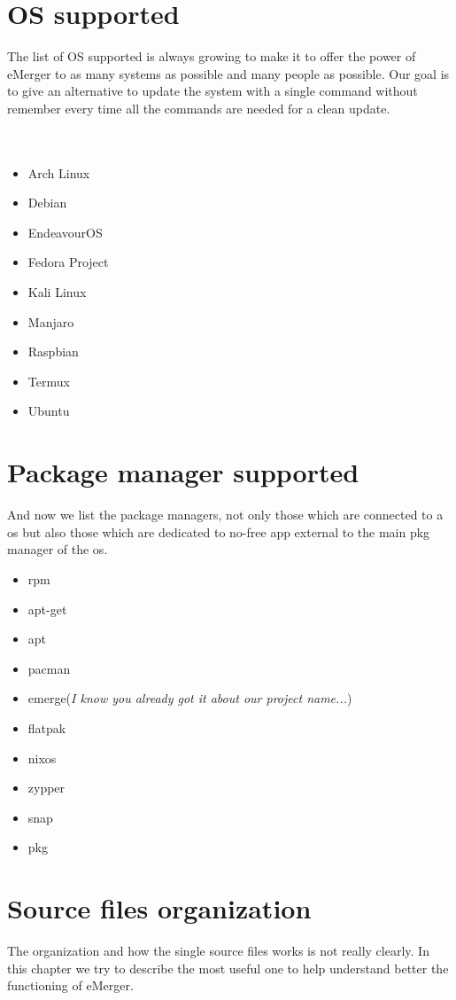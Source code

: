 \documentclass{article}
\begin{document}
\section{OS supported}
The list of OS supported is always growing to make it to offer the power of eMerger to as many systems as possible and many people as possible. Our goal is to give an alternative to update the system with a single command without remember every time all the commands are needed for a clean update. \\ \\ \\ 
\begin{itemize}
\item Arch Linux
\item Debian
\item EndeavourOS
\item Fedora Project
\item Kali Linux
\item Manjaro
\item Raspbian
\item Termux
\item Ubuntu
\end{itemize}
\section{Package manager supported}
And now we list the package managers, not only those which are connected to a os but also those which are dedicated to no-free app external to the main pkg manager of the os.
\begin{itemize}
\item rpm
\item apt-get
\item apt
\item pacman
\item emerge(\textit{I know you already got it about our project name...})
\item flatpak
\item nixos
\item zypper
\item snap
\item pkg
\end{itemize}

\section{Source files organization}
The organization and how the single source files works is not really clearly. In this chapter we try to describe the most useful one to help understand better the functioning of eMerger.
\end{document}
